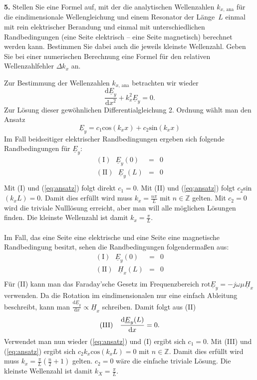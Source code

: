 \documentclass[Protokollheft.tex]{subfiles}
\begin{document}
	\begin{framed}
		\noindent \textbf{5.} Stellen Sie eine Formel auf, mit der die analytischen Wellenzahlen $k_{x,\,\text{ana}}$ für die eindimensionale Wellengleichung und
		einem Resonator der Länge~\(L\) einmal mit rein elektrischer Berandung und einmal mit unterschiedlichen Randbedingungen
		(eine Seite elektrisch -- eine Seite magnetisch) berechnet werden kann. Bestimmen Sie dabei auch die jeweils kleinste Wellenzahl.
		Geben Sie bei einer numerischen Berechnung eine Formel für den relativen Wellenzahlfehler $\Delta k_{x}$ an.\label{exer:kxAnalytic}
	\end{framed}
	\noindent
	Zur Bestimmung der Wellenzahlen $k_{x,\,\text{ana}}$ betrachten wir wieder 
	\begin{equation*}
		\frac{\text{d}\underline{E}_y}{\text{d}x^2}+k^2_x\underline{E}_y=0.
	\end{equation*}
	Zur Lösung dieser gewöhnlichen Differentialgleichung 2. Ordnung wählt man den Ansatz
	\begin{equation}
	\label{eq:ansatz}
	\underline{E}_y=c_1 \text{cos}(k_xx)+c_2 \text{sin}(k_xx)
	\end{equation}
	Im Fall beidseitiger elektrischer Randbedingungen ergeben sich folgende Randbedingungen für $\underline{E}_y$:
	\begin{eqnarray*}
		(\text{I}) \ \ \ \underline{E}_y(0)&=&0\\
		(\text{II}) \ \ \ \underline{E}_y(L)&=&0\\
	\end{eqnarray*}
	Mit (I) und (\ref{eq:ansatz}) folgt direkt $c_1=0$. Mit (II) und (\ref{eq:ansatz}) folgt $c_2$sin$(k_xL)=0$. Damit dies erfüllt wird muss $k_x=\frac{n\pi}{L}$ mit $n \in\mathbb{Z}$ gelten. Mit $c_2=0$ wird die triviale Nulllösung erreicht, aber man will alle möglichen Lösungen finden. Die kleinste Wellenzahl ist damit $k_x=\frac{\pi}{L}$.\\
	\\
	Im Fall, das eine Seite eine elektrische und eine Seite eine magnetische Randbedingung besitzt, sehen die Randbedingungen folgendermaßen aus:
	\begin{eqnarray*}
		(\text{I}) \ \ \ \underline{E}_y(0)&=&0\\
		(\text{II}) \ \ \ \underline{H}_x(L)&=&0\\
	\end{eqnarray*}
	Für (II) kann man das Faraday'sche Gesetz im Frequenzbereich $\text{rot}\underline{E}_y=-j\omega\mu \underline{H}_x$ verwenden. Da die Rotation im eindimensionalen nur eine einfach Ableitung beschreibt, kann man $\frac{\text{d}\underline{E}_y}{\text{d}x}\propto\underline{H}_x$ schreiben. Damit folgt aus (II)
	\begin{equation*}
		(\text{III}) \ \ \ \frac{\text{d}\underline{E}_y(L)}{\text{d}x}=0\\.
	\end{equation*}
	Verwendet man nun wieder (\ref{eq:ansatz}) und (I) ergibt sich $c_1=0$. Mit (III) und (\ref{eq:ansatz}) ergibt sich $c_2k_x\text{cos}(k_xL)=0$ mit $n \in\mathbb{Z}$. Damit dies erfüllt wird muss $k_x=\frac{\pi}{L}(\frac{n}{2}+1)$ gelten. $c_2=0$ wäre die einfache triviale Lösung. Die kleinste Wellenzahl ist damit $k_X=\frac{\pi}{L}$.
	
\end{document}
